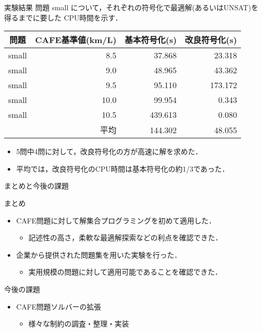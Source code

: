 \documentclass[dvipdfmx, 11pt]{beamer}
\begin{document}
\begin{frame}{実験結果}
 問題 small について，それぞれの符号化で最適解(あるいはUNSAT)を
 得るまでに要した CPU時間を示す．
 \begin{exampleblock}{} \centering 
  \begin{tabular}{crrr}
   問題		& CAFE基準値(km/L)  & 基本符号化(s)   & 改良符号化(s)    \\\hline
   small 	& 8.5              & 37.868         & \alert{23.318}  \\
   small	& 9.0              & 48.965         & \alert{43.362}  \\
   small	& 9.5              & \alert{95.110} & 173.172         \\
   small	& 10.0             & 99.954         & \alert{0.343}   \\
   small	& 10.5             & 439.613        & \alert{0.080}   \\\hline
   \multicolumn{2}{r}{平均}         & 144.302        & \alert{48.055}
  \end{tabular}
 \end{exampleblock}
 \begin{itemize}
  \item 5問中4問に対して，改良符号化の方が高速に解を求めた．
  \item 平均では，改良符号化のCPU時間は基本符号化の約1/3であった．
 \end{itemize}
\end{frame}
\begin{frame}{まとめと今後の課題}
 \begin{block}{まとめ}
  \begin{itemize}
   \item CAFE問題に対して解集合プログラミングを初めて適用した．
	 \begin{itemize}
	  \item 記述性の高さ，柔軟な最適解探索などの利点を確認できた．
	 \end{itemize}
   \item 企業から提供された問題集を用いた実験を行った．
	 \begin{itemize}
	  \item 実用規模の問題に対して適用可能であることを確認できた．
	 \end{itemize}
  \end{itemize}
 \end{block}
 \begin{alertblock}{今後の課題}
  \begin{itemize}
   \item CAFE問題ソルバーの拡張
	 \begin{itemize}
	  \item 様々な制約の調査・整理・実装
	 \end{itemize}
  \end{itemize}
 \end{alertblock}
\end{frame}
\end{document}
